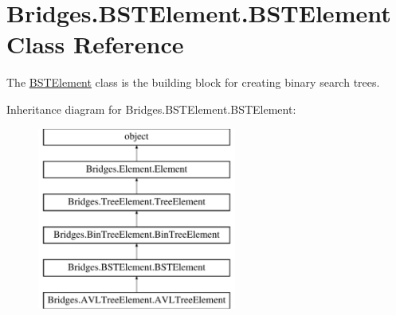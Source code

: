 \hypertarget{class_bridges_1_1_b_s_t_element_1_1_b_s_t_element}{}\section{Bridges.\+B\+S\+T\+Element.\+B\+S\+T\+Element Class Reference}
\label{class_bridges_1_1_b_s_t_element_1_1_b_s_t_element}


The \mbox{\hyperlink{class_bridges_1_1_b_s_t_element_1_1_b_s_t_element}{B\+S\+T\+Element}} class is the building block for creating binary search trees.  


Inheritance diagram for Bridges.\+B\+S\+T\+Element.\+B\+S\+T\+Element\+:\begin{figure}[H]
\begin{center}
\leavevmode
\includegraphics[height=6.000000cm]{class_bridges_1_1_b_s_t_element_1_1_b_s_t_element}
\end{center}
\end{figure}
